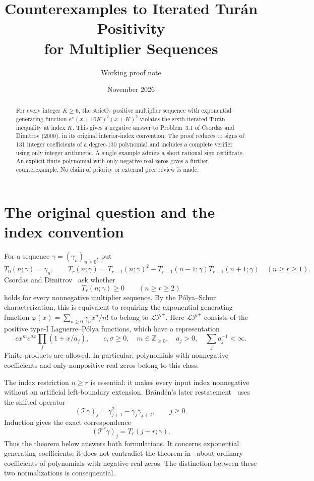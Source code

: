 \documentclass[11pt]{article}
\title{Counterexamples to Iterated Tur\'an Positivity\\for Multiplier Sequences}
\author{Working proof note}
\date{November 2026}
\newcommand{\LP}{\mathcal{LP}^{+}}
\begin{document}
\maketitle
\begin{abstract}
For every integer $K\ge6$, the strictly positive multiplier sequence with
exponential generating function $e^x(x+10K)^2(x+K)^2$ violates the sixth
iterated Tur\'an inequality at index $K$. This gives a negative answer to
Problem~3.1 of Csordas and Dimitrov (2000), in its original interior-index
convention. The proof reduces to signs of 131 integer coefficients of a
degree-130 polynomial and includes a complete verifier using only integer
arithmetic. A single example admits a short rational sign certificate.
An explicit finite polynomial with only negative real zeros gives a further
counterexample. No claim of priority or external peer review is made.
\end{abstract}

\section{The original question and the index convention}
For a sequence $\gamma=(\gamma_n)_{n\ge0}$, put
\begin{equation}\label{eq:turan}
T_0(n;\gamma)=\gamma_n,\qquad
T_r(n;\gamma)=T_{r-1}(n;\gamma)^2
 -T_{r-1}(n-1;\gamma)T_{r-1}(n+1;\gamma)
\quad(n\ge r\ge1).
\end{equation}
Csordas and Dimitrov~\cite[Problem~3.1]{CD} ask whether
\begin{equation}\label{eq:question}
T_r(n;\gamma)\ge0\qquad(n\ge r\ge2)
\end{equation}
holds for every nonnegative multiplier sequence. By the P\'olya--Schur
characterization, this is equivalent to requiring the exponential generating
function $\varphi(x)=\sum_{n\ge0}\gamma_nx^n/n!$ to belong to $\LP$.
Here $\LP$ consists of the positive type-I Laguerre--P\'olya functions,
which have a representation
\[
c x^m e^{\sigma x}\prod_j(1+x/a_j),\qquad
c,\sigma\ge0,\quad m\in\mathbb Z_{\ge0},\quad a_j>0,
\quad\sum_j a_j^{-1}<\infty.
\]
Finite products are allowed. In particular, polynomials with nonnegative
coefficients and only nonpositive real zeros belong to this class.

The index restriction $n\ge r$ is essential: it makes every input index
nonnegative without an artificial left-boundary extension. Br\"and\'en's
later restatement~\cite[Problem~8.1]{B} uses the shifted operator
\[
(\mathcal T\gamma)_j=\gamma_{j+1}^2-\gamma_j\gamma_{j+2},\qquad j\ge0.
\]
Induction gives the exact correspondence
\begin{equation}\label{eq:shift}
(\mathcal T^r\gamma)_j=T_r(j+r;\gamma).
\end{equation}
Thus the theorem below answers both formulations. It concerns exponential
generating coefficients; it does not contradict the theorem in~\cite{B}
about ordinary coefficients of polynomials with negative real zeros.
The distinction between these two normalizations is consequential.
\end{document}
